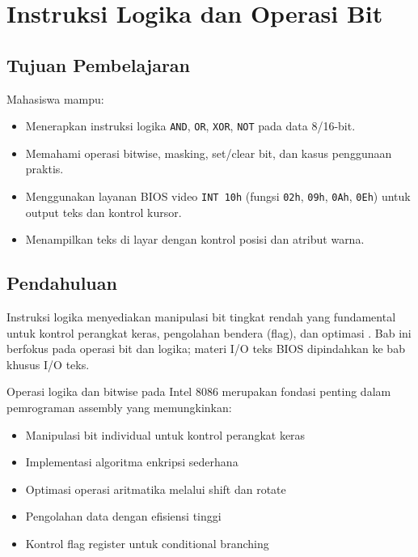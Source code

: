 \documentclass[../main.tex]{subfiles}
\begin{document}
\chapter{Instruksi Logika dan Operasi Bit}

    \section{Tujuan Pembelajaran}
        Mahasiswa mampu:
        \begin{itemize}
            \item Menerapkan instruksi logika \texttt{AND}, \texttt{OR}, \texttt{XOR}, \texttt{NOT} pada data 8/16-bit.
            \item Memahami operasi bitwise, masking, set/clear bit, dan kasus penggunaan praktis.
            \item Menggunakan layanan BIOS video \texttt{INT 10h} (fungsi \texttt{02h}, \texttt{09h}, \texttt{0Ah}, \texttt{0Eh}) untuk output teks dan kontrol kursor.
            \item Menampilkan teks di layar dengan kontrol posisi dan atribut warna.
        \end{itemize}

    \section{Pendahuluan}
        Instruksi logika menyediakan manipulasi bit tingkat rendah yang fundamental untuk kontrol perangkat keras, pengolahan bendera (flag), dan optimasi \cite{8086_instruction_set_reference}. Bab ini berfokus pada operasi bit dan logika; materi I/O teks BIOS dipindahkan ke bab khusus I/O teks.

        Operasi logika dan bitwise pada Intel 8086 merupakan fondasi penting dalam pemrograman assembly yang memungkinkan:
        \begin{itemize}
            \item Manipulasi bit individual untuk kontrol perangkat keras
            \item Implementasi algoritma enkripsi sederhana
            \item Optimasi operasi aritmatika melalui shift dan rotate
            \item Pengolahan data dengan efisiensi tinggi
            \item Kontrol flag register untuk conditional branching
        \end{itemize}
\end{document}
